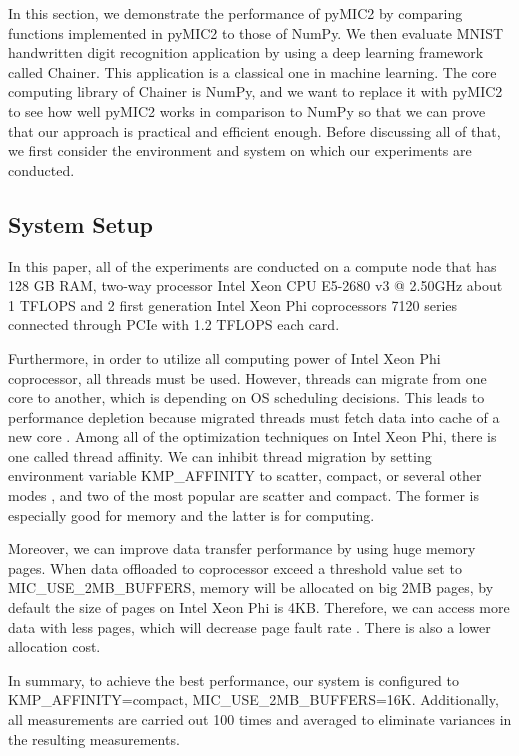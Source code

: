 In this section, we demonstrate the performance of pyMIC2 by comparing functions implemented in pyMIC2 to those of NumPy. We then evaluate MNIST handwritten digit recognition application by using a deep learning framework called Chainer. This application is a classical one in machine learning. The core computing library of Chainer is NumPy, and we want to replace it with pyMIC2 to see how well pyMIC2 works in comparison to NumPy so that we can prove that our approach is practical and efficient enough. Before discussing all of that, we first consider the environment and system on which our experiments are conducted.

\subsection{System Setup}
In this paper, all of the experiments are conducted on a compute node that has 128 GB RAM, two-way processor Intel Xeon CPU E5-2680 v3 @ 2.50GHz about 1 TFLOPS and 2 first generation Intel Xeon Phi coprocessors 7120 series connected through PCIe with 1.2 TFLOPS each card.

Furthermore, in order to utilize all computing power of Intel Xeon Phi coprocessor, all threads must be used. However, threads can migrate from one core to another, which is depending on OS scheduling decisions. This leads to performance depletion because migrated threads must fetch data into cache of a new core \cite{colfaxbook}. Among all of the optimization techniques on Intel Xeon Phi, there is one called thread affinity. We can inhibit thread migration by setting environment variable KMP\_AFFINITY to scatter, compact, or several other modes \cite{threadaffinity}, and two of the most popular are scatter and compact. The former is especially good for memory and the latter is for computing.

Moreover, we can improve data transfer performance by using huge memory pages. When data offloaded to coprocessor exceed a threshold value set to MIC\_USE\_2MB\_BUFFERS, memory will be allocated on big 2MB pages, by default the size of pages on Intel Xeon Phi is 4KB. Therefore, we can access more data with less pages, which will decrease page fault rate \cite{bigmempage}. There is also a lower allocation cost.


In summary, to achieve the best performance, our system is configured to KMP\_AFFINITY=compact, MIC\_USE\_2MB\_BUFFERS=16K. Additionally, all measurements are carried out 100 times and averaged to eliminate variances in the resulting measurements.

